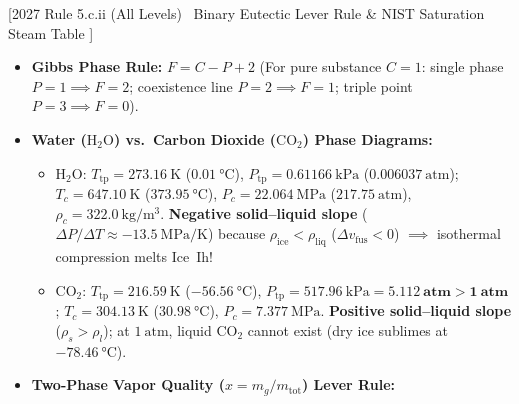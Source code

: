 \documentclass[10pt,twoside,openany,letterpaper]{book}
\begin{document}
\begin{quicksheet}\label{qr:05}
[2027 Rule 5.c.ii (All Levels) \textbar\ Binary Eutectic Lever Rule \& NIST Saturation Steam Table ]

\begin{twocol}[0.50]
\begin{formulacard}
\scriptsize
\begin{itemize}
  \item \textbf{Gibbs Phase Rule:} $\boxed{F = C - P + 2}$ (For pure substance $C=1$: single phase $P=1\implies F=2$; coexistence line $P=2\implies F=1$; triple point $P=3\implies F=0$).
  \item \textbf{Water ($\mathrm{H_2O}$) vs.\ Carbon Dioxide ($\mathrm{CO_2}$) Phase Diagrams:}
  \begin{itemize}
    \item $\mathbf{\mathrm{H_2O}}$: $T_{\mathrm{tp}} = \SI{273.16}{\kelvin}$ ($\SI{0.01}{\celsius}$), $P_{\mathrm{tp}} = \SI{0.61166}{\kilo\pascal}$ ($\SI{0.006037}{\text{atm}}$); $T_c = \SI{647.10}{\kelvin}$ ($\SI{373.95}{\celsius}$), $P_c = \SI{22.064}{\mega\pascal}$ ($\SI{217.75}{\text{atm}}$), $\rho_c = \SI{322.0}{\kilogram\per\cubic\meter}$. \textbf{Negative solid--liquid slope} ($\Delta P/\Delta T \approx \SI{-13.5}{\mega\pascal\per\kelvin}$) because $\rho_{\mathrm{ice}} < \rho_{\mathrm{liq}}$ ($\Delta v_{\mathrm{fus}} < 0$) $\implies$ isothermal compression melts Ice~Ih!
    \item $\mathbf{\mathrm{CO_2}}$: $T_{\mathrm{tp}} = \SI{216.59}{\kelvin}$ ($\SI{-56.56}{\celsius}$), $P_{\mathrm{tp}} = \SI{517.96}{\kilo\pascal} = \mathbf{\SI{5.112}{\text{atm}} > \SI{1}{\text{atm}}}$; $T_c = \SI{304.13}{\kelvin}$ ($\SI{30.98}{\celsius}$), $P_c = \SI{7.377}{\mega\pascal}$. \textbf{Positive solid--liquid slope} ($\rho_s > \rho_l$); at $\SI{1}{\text{atm}}$, liquid $\mathrm{CO_2}$ cannot exist (dry ice sublimes at $\SI{-78.46}{\celsius}$).
  \end{itemize}
  \item \textbf{Two-Phase Vapor Quality ($x = m_g/m_{\mathrm{tot}}$) Lever Rule:}

\end{itemize}
\end{formulacard}
\end{twocol}
\end{quicksheet}
\end{document}
